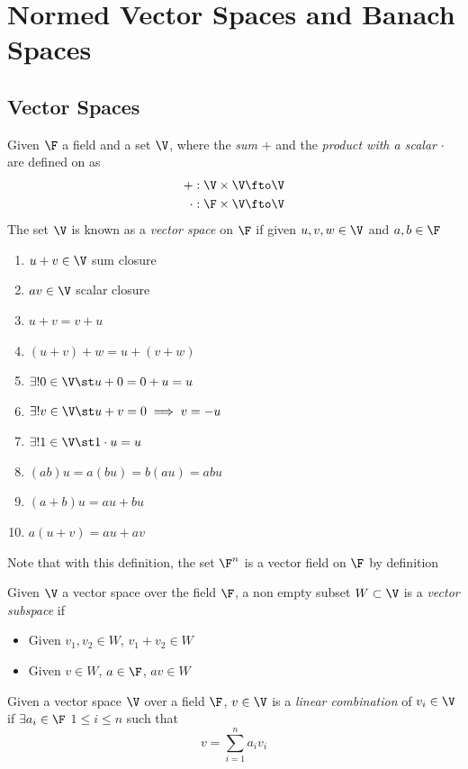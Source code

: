 \documentclass[../mmf.tex]{subfiles}
\begin{document}
\section{Normed Vector Spaces and Banach Spaces}
\subsection{Vector Spaces}
\begin{dfn}
	Given $\F$ a field and a set $\V$, where the \textit{sum} $+$ and the \textit{product with a scalar} $\cdot$ are defined on as
	\begin{equation*}
		\begin{aligned}
			+:\V\times\V&\fto\V\\
			\cdot:\F\times\V&\fto\V
		\end{aligned}
	\end{equation*}
	The set $\V$ is known as a \textit{vector space} on $\F$ if given $u, v, w\in\V$ and $a, b\in\F$
	\begin{enumerate}
	\item $u+v\in\V$ sum closure
	\item $av\in\V$ scalar closure
	\item $u+v=v+u$
	\item $(u+v)+w=u+(v+w)$
	\item $\exists!0\in\V\st u+0=0+u=u$
	\item $\exists!v\in\V\st u+v=0\implies{} v=-u$
	\item $\exists!1\in\V\st 1\cdot u=u$
	\item $(ab)u=a(bu)=b(au)=abu$
	\item $(a+b)u=au+bu$
	\item $a(u+v)=au+av$
	\end{enumerate}
	Note that with this definition, the set $\F^n$ is a vector field on $\F$ by definition
\end{dfn}
\begin{dfn}
	Given $\V$ a vector space over the field $\F$, a non empty subset $W\subset\V$ is a \textit{vector subspace} if
	\begin{itemize}
	\item Given $v_1, v_2\in W$, $v_1+v_2\in W$
	\item Given $v\in W$, $a\in\F$, $a v\in W$
	\end{itemize}
\end{dfn}
\begin{dfn}
	Given a vector space $\V$ over a field $\F$, $v\in\V$ is a \textit{linear combination} of $v_i\in \V$ if $\exists a_i\in\F$ $1\le i\le n$ such that
	\begin{equation*}
		v=\sum_{i=1}^na_iv_i
	\end{equation*}
\end{dfn}
\end{document}
